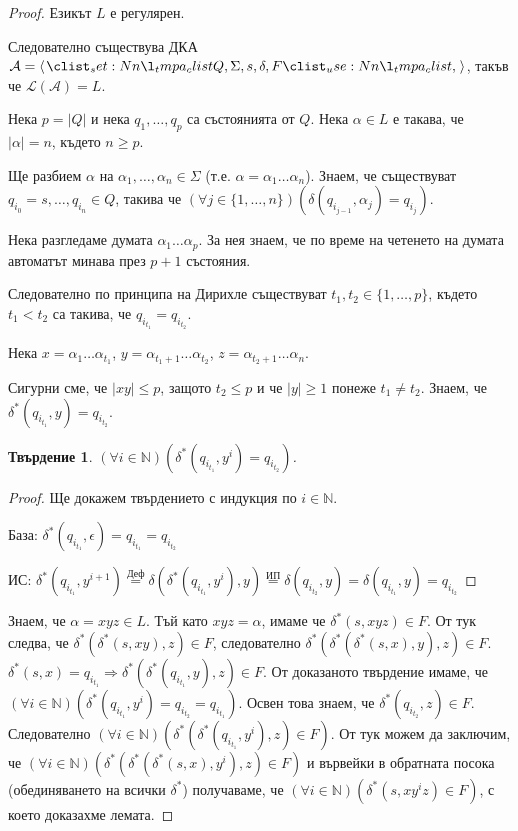 \documentclass[a5paper]{report}
\theoremstyle{definition}
\theoremstyle{plain}
\newtheorem{claim}[definition]{Твърдение}
\theoremstyle{remark}
\theoremstyle{definition}
\begin{document}
\begin{proof}
    Езикът $L$ е регулярен.

    Следователно съществува ДКА
    $\mathcal{A} = \opair{Q, \Sigma, s, \delta, F}$,
    такъв че $\mathcal{L}(\mathcal{A}) = L$.

    Нека $p = |Q|$ и нека $q_1, \dots, q_p$ са състоянията от $Q$.
    Нека $\alpha \in L$ е такава, че $|\alpha| = n$, където $n \geq p$.

    Ще разбием $\alpha$ на $\alpha_1, \dots, \alpha_n \in \Sigma$ (т.е. $\alpha = \alpha_1\dots\alpha_n$).
    Знаем, че съществуват $q_{i_0} = s, \dots, q_{i_n} \in Q$, такива че
    $(\forall j \in \{1, \dots, n\}) (\delta(q_{i_{j-1}}, \alpha_j) = q_{i_j})$.

    Нека разгледаме думата $\alpha_1 \dots \alpha_p$.
    За нея знаем, че по време на четенето на думата
    автоматът минава през $p + 1$ състояния.

    Следователно по принципа на Дирихле съществуват $t_1, t_2 \in \{1, \dots, p\}$,
    където $t_1 < t_2$ са такива,
    че $q_{i_{t_1}} = q_{i_{t_2}}$.

    Нека
    $x = \alpha_1 \dots \alpha_{t_1}$,
    $y = \alpha_{t_1 + 1} \dots \alpha_{t_2}$,
    $z = \alpha_{t_2 + 1} \dots \alpha_n$.
    
    Сигурни сме, че $|xy| \leq p$, защото $t_2 \leq p$ и че $|y| \geq 1$ понеже $t_1 \neq t_2$.
    Знаем, че $\delta^*(q_{i_{t_1}}, y) = q_{i_{t_2}}$.

    \begin{claim}
        $(\forall i \in \mathbb{N}) (\delta^*(q_{i_{t_1}}, y^i) = q_{i_{t_2}})$.
    \end{claim}

    \begin{proof}
        Ще докажем твърдението с индукция по $i \in \mathbb{N}$.

        База: $\delta^*(q_{i_{t_1}}, \epsilon) = q_{i_{t_1}} = q_{i_{t_2}}$ \checkmark

        ИС: $\delta^*(q_{i_{t_1}}, y^{i+1}) \overset{\text{Деф}}{=} \delta(\delta^*(q_{i_{t_1}}, y^i), y) \overset{\text{ИП}}{=} \delta(q_{i_{t_2}}, y) = \delta(q_{i_{t_1}}, y) = q_{i_{t_2}}$
    \end{proof}

    Знаем, че $\alpha = xyz \in L$.
    Тъй като $xyz = \alpha$, имаме че $\delta^*(s, xyz) \in F$.
    От тук следва, че $\delta^*(\delta^*(s, xy), z) \in F$,
    следователно $\delta^*(\delta^*(\delta^*(s, x), y), z) \in F$.
    $\delta^*(s, x) = q_{i_{t_1}} \Rightarrow \delta^*(\delta^*(q_{i_{t_1}}, y), z) \in F$.
    От доказаното твърдение имаме, че $(\forall i \in \mathbb{N}) (\delta^*(q_{i_{t_1}}, y^i) = q_{i_{t_2}} = q_{i_{t_1}})$.
    Освен това знаем, че $\delta^*(q_{i_{t_2}}, z) \in F$.
    Следователно
    $(\forall i \in \mathbb{N}) (\delta^*(\delta^*(q_{i_{t_1}}, y^i), z) \in F)$.
    От тук можем да заключим, че
    $(\forall i \in \mathbb{N}) (\delta^*(\delta^*(\delta^*(s, x), y^i), z) \in F)$
    и вървейки в обратната посока (обединяването на всички $\delta^*$) получаваме, че
    $(\forall i \in \mathbb{N}) (\delta^*(s, xy^iz) \in F)$,
    с което доказахме лемата.

\end{proof}
\end{document}
